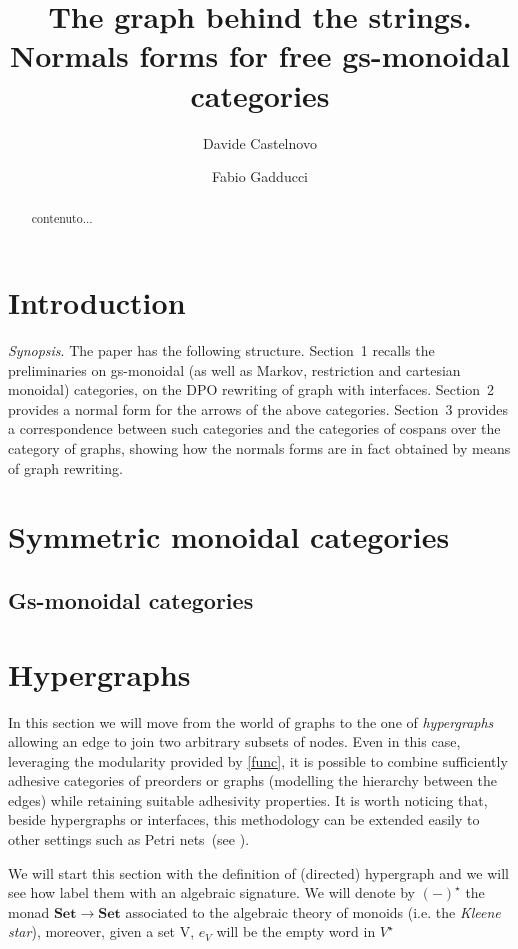 \documentclass[a4paper,UKenglish,cleveref,pdftex,thm-restate,numberwithinsect]{lipics-v2021}
\author{Davide Castelnovo}
{Department of Computer Science, University of Pisa, Italy}
{castelnovod@gmail.com}
{https://orcid.org/0000-0002-5926-5615}{}
\author{Fabio Gadducci}
{Department of Computer Science, University of Pisa, Italy}
{fabio.gadducci@unipi.it}
{https://orcid.org/0000-0003-0690-3051}{}
\title{The graph behind the strings.\\ Normals forms for free gs-monoidal categories}
\newcommand{\cat}[1]{\ensuremath{\mathbf{#1}}}
\begin{document}
	\maketitle
\begin{abstract}
	contenuto...
\end{abstract}	

\tableofcontents
\section{Introduction}

\emph{Synopsis}. The paper has the following structure. Section~1 recalls the preliminaries on gs-monoidal  (as well as Markov, restriction and cartesian monoidal) categories,
on the DPO rewriting of graph with interfaces. Section~2 provides a normal form for the arrows of the above categories. Section~3 provides a correspondence between 
such categories and the categories of cospans over the category of graphs, showing how the normals forms are in fact obtained by means of graph rewriting.

\section{Symmetric monoidal categories}
\subsection{Gs-monoidal categories}

\section{Hypergraphs}

In this section we will move from the world of graphs to the one of \emph{hypergraphs} allowing an edge to join two arbitrary subsets of nodes. Even in this case,  leveraging the modularity provided by \cref{func}, it is possible to combine sufficiently adhesive categories of preorders or graphs (modelling the hierarchy between the edges) while retaining suitable adhesivity properties.  It is worth noticing that, beside hypergraphs or interfaces, this methodology can be extended easily to other settings such as Petri nets~(see \cite{ehrig1991parallelism}).


We will start this section with the definition of (directed) hypergraph and we will see how label them with an algebraic signature. We will denote by $(-)^\star$ the monad $\cat{Set}\to \cat{Set}$ associated to the algebraic theory of monoids (i.e. the \emph{Kleene star}), moreover, given a set V, $e_V$ will be the empty word in $V^{\star}$ 
\end{document}
